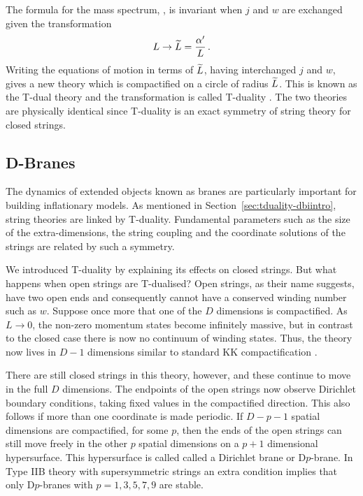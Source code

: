The formula for the mass spectrum, , is invariant
when $j$ and $w$ are exchanged given the transformation
\begin{equation}
 L \rightarrow \widetilde{L} = \frac{\alpha'}{L}\,.
\end{equation}
Writing the equations of motion in terms of $\widetilde{L}$, having interchanged $j$ and
$w$,
gives a new theory
which is compactified on a circle of radius $\widetilde{L}$. This is known as the
T-dual theory and the transformation is called T-duality
\cite{Sakai1986,Kikkawa1984b}. The two
theories are physically identical since T-duality is an exact symmetry
of string theory for closed strings.

% 
\subsection{D-Branes}
\label{sec:dbranes-dbiintro}
The dynamics of extended objects known as branes are particularly important for
building inflationary models.
As mentioned in Section~\ref{sec:tduality-dbiintro}, string
theories are linked by T-duality. Fundamental parameters such as the size of the
extra-dimensions, the string coupling and the
coordinate solutions of the strings are related by such a symmetry.


We introduced T-duality by explaining
its effects on closed strings. But what happens when open strings are
T-dualised? Open strings, as their name suggests, have two open ends and
consequently cannot have a conserved winding number such as $w$. Suppose once more
that one
of the $D$ dimensions is compactified. As $L\rightarrow0$, the non-zero momentum
states become infinitely massive, but in contrast to the closed case there is now
no continuum of winding states. Thus, the theory now lives in $D-1$ dimensions
similar to standard KK compactification \cite{Johnson2000}.

There are still closed strings in this theory, however, and these continue to
move in the full $D$ dimensions. The endpoints of the open strings now observe
Dirichlet boundary conditions, taking fixed values in the compactified
direction. This also follows if more than one coordinate is made periodic.
If $D-p-1$ spatial dimensions are compactified, for some $p$, then the ends of
the open
strings can still move freely in the other $p$ spatial dimensions on a $p+1$
dimensional hypersurface. This hypersurface is called called a Dirichlet brane or
D$p$-brane. 
% 
In Type IIB theory with supersymmetric strings an extra condition implies that
only D$p$-branes with $p=1,3,5,7,9$ are stable\footnotemark.
% 

